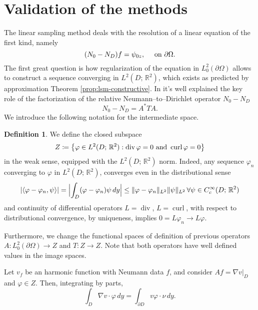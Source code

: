 \documentclass[10pt, a4paper, twoside, openright]{book}
\theoremstyle{definition}
\newtheorem{definition}[subsection]{Definition}
\theoremstyle{plain}
\theoremstyle{plain}
\theoremstyle{plain}
\theoremstyle{plain}
\theoremstyle{plain}
\theoremstyle{plain}
\theoremstyle{plain}
\theoremstyle{plain}
\DeclareMathOperator{\divergence}{div}
\DeclareMathOperator{\curl}{curl}
\let\phi\varphi
\begin{document}
\section{Validation of the methods}
\label{section:validation}
The linear sampling method deals with the resolution of a linear equation of the first kind, namely
\begin{equation}
\label{eq:NtoD_firstkind}
 ({N_0} - {N_D}) f = \psi_{0z},\quad \textup{ on }\partial \Omega.
\end{equation}
The first great question is how regularization of the equation in $L^2_0(\partial \Omega)$
allows to construct a sequence converging in $L^2(D;\,\mathbb{R}^2)$, which exists 
as predicted by approximation Theorem \ref{prop:lsm-constructive}.
In \cite{arens:why} it's well explained the key role of the factorization 
of the relative Neumann--to--Dirichlet operator ${N_0} - {N_D}$
\begin{equation}
 {N_0} - {N_D} = A^*TA.
\end{equation}
We introduce the following notation for the intermediate space.
\begin{definition}
We define the closed subspace
\begin{equation}
 Z\coloneqq\bigl\{\phi\in L^2(D;\,\mathbb{R}^2):\divergence\phi=0 \textup{ and } \curl\phi=0\bigr\}
\end{equation}
in the weak sense, equipped with the $L^2(D;\,\mathbb{R}^2)$ norm. Indeed, any sequence $\phi_n$ converging to $\phi$ in $L^2(D;\,\mathbb{R}^2)$, converges even in the distributional sense
\begin{equation}
 |\langle\phi-\phi_n, \psi\rangle|=\Bigl|\int_D(\phi-\phi_n)\psi\,dy\Bigr|\leq\|\phi - \phi_n\|_{L^2}\|\psi\|_{L^2}\, \forall\psi\in C^\infty_c(D;\,\mathbb{R}^2)
\end{equation}
and continuity of differential operators $L=\divergence$, $L=\curl$, with respect to distributional convergence, by uniqueness, implies $0=L\phi_n\to L\phi$.
\par 
Furthermore, we change the functional spaces of definition of previous operators $A:L^2_0(\partial \Omega)\to Z$ and $T:Z \to Z$. 
Note that both operators have well defined values in the image spaces.
\end{definition}
Let $v_f$ be an harmonic function with Neumann data $f$, and consider $Af=\nabla v|_{D}$ and $\phi\in Z$. Then, integrating by parts,
\begin{equation}
 \int_D\nabla v\cdot \phi\,dy=\int_{\partial D}v \phi\cdot\nu\,dy.
\end{equation}
\end{document}
